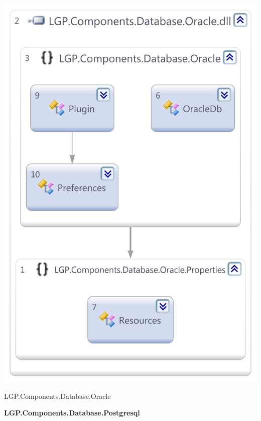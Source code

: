 \begin{multicols}{2}
			\begin{figurehere}
				\centering
				\includegraphics[scale=0.35]{pages/appendix3/figures/dllscreens/oracle.png}
				\caption{LGP.Components.Database.Oracle}
			\end{figurehere}
		
		

		\large{\bfseries{LGP.Components.Database.Postgresql}}
		\vspace{5mm}
		

\end{multicols}
